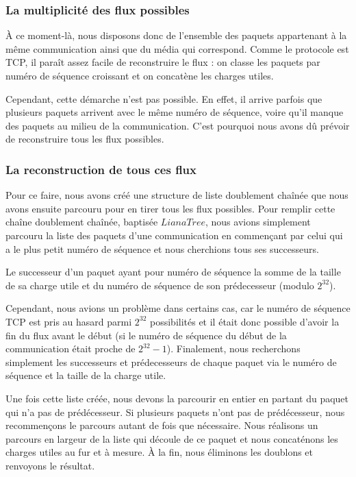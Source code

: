 \subsubsection{La multiplicité des flux possibles}%
À ce moment-là, nous disposons donc de l'ensemble des paquets appartenant à la même communication ainsi que du média qui correspond. Comme le protocole est TCP,
il paraît assez facile de reconstruire le flux : on classe les paquets par numéro de séquence croissant et on concatène les charges utiles.

 Cependant, cette démarche 
n'est pas possible. En effet, il arrive parfois que plusieurs paquets arrivent avec le même numéro de séquence, voire qu'il manque des paquets au milieu de la communication.
C'est pourquoi nous avons dû prévoir de reconstruire tous les flux possibles.


\subsubsection{La reconstruction de tous ces flux}%
Pour ce faire, nous avons créé une structure de liste doublement chaînée que nous avons ensuite parcouru pour en tirer tous les flux possibles. Pour remplir cette chaîne
doublement chaînée, baptisée $LianaTree$, nous avions simplement parcouru la liste des paquets d'une communication en commençant par celui qui a le plus petit numéro de séquence et 
nous cherchions tous ses successeurs. 

Le successeur d'un paquet ayant pour numéro de séquence la somme de la taille de sa charge utile et du numéro de séquence de son prédecesseur 
(modulo $2^{32}$).

Cependant, nous avions un problème dans certains cas, car le numéro de séquence TCP est pris au hasard parmi $2^{32}$ possibilités et il était donc possible d'avoir la fin du flux 
avant le début (si le numéro de séquence du début de la communication était proche de $2^{32} -1$). Finalement, nous recherchons simplement les successeurs et prédecesseurs de chaque
paquet via le numéro de séquence et la taille de la charge utile.

Une fois cette liste créée, nous devons la parcourir en entier en partant du paquet qui n'a pas de prédécesseur. Si plusieurs paquets n'ont pas de prédécesseur, nous recommençons le parcours autant de fois que nécessaire. Nous réalisons un parcours en largeur de la liste qui découle de ce paquet et nous concaténons les charges utiles au fur et à mesure. À la fin, nous éliminons les doublons et renvoyons le résultat.


